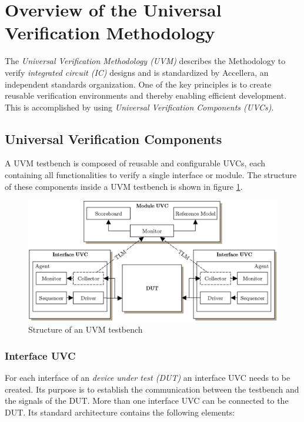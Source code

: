 \section{Overview of the Universal Verification Methodology}\label{uvm}

The \emph{Universal Verification Methodology (UVM)} describes the Methodology to
verify \emph{integrated circuit (IC)} designs and is standardized by Accellera,
an independent standards organization. One of the key principles is to create
reusable verification environments and thereby enabling efficient development.
This is accomplished by using \emph{Universal Verification Components (UVCs)}.

\subsection{Universal Verification Components}\label{uvc}

A UVM testbench is composed of reusable and configurable UVCs, each
containing all functionalities to verify a single interface or module. The
structure of these components inside a UVM testbench is shown in figure
\ref{fig:UVM_testbench}.

\begin{figure}[htb]
 \centering
 \includegraphics[width=1.0\textwidth,angle=0]{abb/UVM_testbench}
 \caption{Structure of an UVM testbench}
\label{fig:UVM_testbench}
\end{figure}

\subsubsection{Interface UVC}\label{interface_uvc}

For each interface of an \emph{device under test (DUT)} an interface UVC needs
to be created. Its purpose is to establish the communication between
the testbench and the signals of the DUT. More than one interface UVC can be
connected to the DUT. Its standard architecture contains the following elements:

